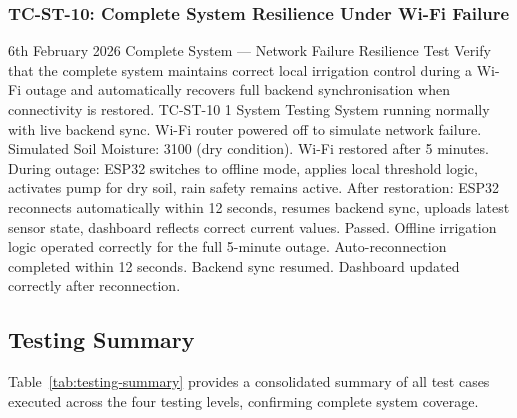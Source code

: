 \subsubsection{TC-ST-10: Complete System Resilience Under Wi-Fi Failure}

\testcase%
{6th February 2026}%
{Complete System --- Network Failure Resilience Test}%
{Verify that the complete system maintains correct local
irrigation control during a Wi-Fi outage and automatically
recovers full backend synchronisation when connectivity
is restored.}%
{TC-ST-10}%
{1}%
{System Testing}%
{System running normally with live backend sync. \newline
Wi-Fi router powered off to simulate network failure.
\newline
Simulated Soil Moisture: 3100 (dry condition). \newline
Wi-Fi restored after 5 minutes.}%
{During outage: ESP32 switches to offline mode, applies
local threshold logic, activates pump for dry soil, rain
safety remains active. \newline
After restoration: ESP32 reconnects automatically within
12 seconds, resumes backend sync, uploads latest sensor
state, dashboard reflects correct current values.}%
{Passed. Offline irrigation logic operated correctly for
the full 5-minute outage. Auto-reconnection completed
within 12 seconds. Backend sync resumed. Dashboard
updated correctly after reconnection.}

\subsection{Testing Summary}

Table~\ref{tab:testing-summary} provides a consolidated
summary of all test cases executed across the four testing
levels, confirming complete system coverage.

